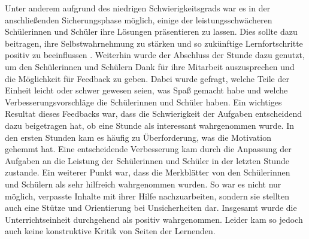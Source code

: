 Unter anderem aufgrund des niedrigen Schwierigkeitsgrads war es in der anschließenden Sicherungsphase möglich, einige der leistungsschwächeren Schülerinnen und Schüler ihre Lösungen präsentieren zu lassen.
Dies sollte dazu beitragen, ihre Selbstwahrnehmung zu stärken und so zukünftige Lernfortschritte positiv zu beeinflussen \cite{marsh2008reciprocal}.
Weiterhin wurde der Abschluss der Stunde dazu genutzt, um den Schülerinnen und Schülern Dank für ihre Mitarbeit auszusprechen und die Möglichkeit für Feedback zu geben.
Dabei wurde gefragt, welche Teile der Einheit leicht oder schwer gewesen seien, was Spaß gemacht habe und welche Verbesserungsvorschläge die Schülerinnen und Schüler haben.
Ein wichtiges Resultat dieses Feedbacks war, dass die Schwierigkeit der Aufgaben entscheidend dazu beigetragen hat, ob eine Stunde als interessant wahrgenommen wurde.
In den ersten Stunden kam es häufig zu Überforderung, was die Motivation gehemmt hat.
Eine entscheidende Verbesserung kam durch die Anpassung der Aufgaben an die Leistung der Schülerinnen und Schüler in der letzten Stunde zustande.
Ein weiterer Punkt war, dass die Merkblätter von den Schülerinnen und Schülern als sehr hilfreich wahrgenommen wurden.
So war es nicht nur möglich, verpasste Inhalte mit ihrer Hilfe nachzuarbeiten, sondern sie stellten auch eine Stütze und Orientierung bei Unsicherheiten dar.
Insgesamt wurde die Unterrichtseinheit durchgehend als positiv wahrgenommen.
Leider kam so jedoch auch keine konstruktive Kritik von Seiten der Lernenden.